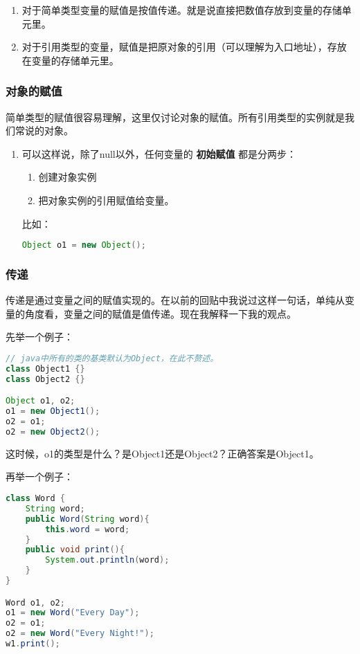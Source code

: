 \documentclass[10pt,b5paper]{article}
\begin{document}
\begin{enumerate}
\item 对于简单类型变量的赋值是按值传递。就是说直接把数值存放到变量的存储单元里。

\item 对于引用类型的变量，赋值是把原对象的引用（可以理解为入口地址），存放在变量的存储单元里。
\end{enumerate}
\subsubsection{对象的赋值}
\label{sec-1-8-2}
简单类型的赋值很容易理解，这里仅讨论对象的赋值。所有引用类型的实例就是我们常说的对象。

\begin{enumerate}
\item 可以这样说，除了null以外，任何变量的 \textbf{初始赋值} 都是分两步：
\label{sec-1-8-2-1}

\begin{enumerate}
\item 创建对象实例

\item 把对象实例的引用赋值给变量。
\end{enumerate}

比如：
\begin{lstlisting}[language=java]
       Object o1 = new Object();
\end{lstlisting}
\end{enumerate}
\subsubsection{传递}
\label{sec-1-8-3}
传递是通过变量之间的赋值实现的。在以前的回贴中我说过这样一句话，单纯从变量的角度看，变量之间的赋值是值传递。现在我解释一下我的观点。

先举一个例子：
\begin{lstlisting}[language=java]
// java中所有的类的基类默认为Object，在此不赘述。
class Object1 {}
class Object2 {}

Object o1, o2;
o1 = new Object1();
o2 = o1;
o2 = new Object2();
\end{lstlisting}

这时候，o1的类型是什么？是Object1还是Object2？正确答案是Object1。

再举一个例子：
\begin{lstlisting}[language=java]
class Word {
    String word;
    public Word(String word){
        this.word = word;
    }
    public void print(){
        System.out.println(word);
    }
}

Word o1, o2;
o1 = new Word("Every Day");
o2 = o1;
o2 = new Word("Every Night!");
w1.print();
\end{lstlisting}
\end{document}
